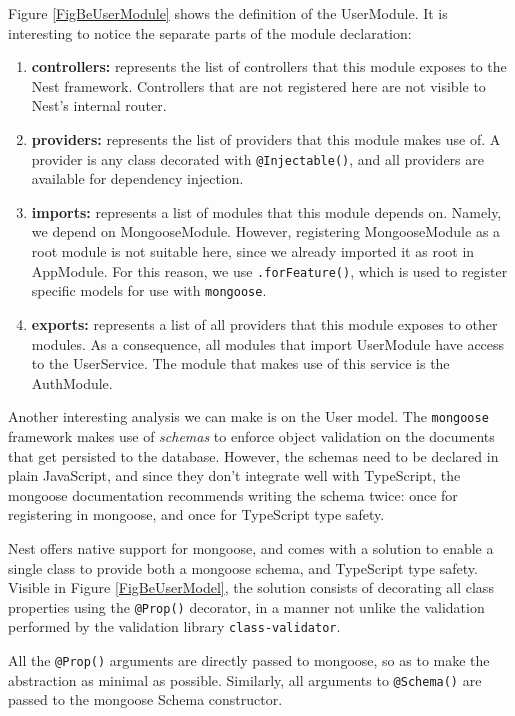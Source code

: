 Figure \ref{FigBeUserModule} shows the definition of the UserModule. It is interesting to notice the separate parts of the module declaration:
\begin{enumerate}
    \item \textbf{controllers:} represents the list of controllers that this module exposes to the Nest framework. Controllers that are not registered here are not visible to Nest's internal router.
    \item \textbf{providers:} represents the list of providers that this module makes use of. A provider is any class decorated with \verb|@Injectable()|, and all providers are available for dependency injection.
    \item \textbf{imports:} represents a list of modules that this module depends on. Namely, we depend on MongooseModule. However, registering MongooseModule as a root module is not suitable here, since we already imported it as root in AppModule. For this reason, we use \verb|.forFeature()|, which is used to register specific models for use with \verb|mongoose|.
    \item \textbf{exports:} represents a list of all providers that this module exposes to other modules. As a consequence, all modules that import UserModule have access to the UserService. The module that makes use of this service is the AuthModule.
\end{enumerate}

Another interesting analysis we can make is on the User model. The \verb|mongoose| framework makes use of \textit{schemas} to enforce object validation on the documents that get persisted to the database. However, the schemas need to be declared in plain JavaScript, and since they don't integrate well with TypeScript, the mongoose documentation recommends writing the schema twice: once for registering in mongoose, and once for TypeScript type safety.

Nest offers native support for mongoose, and comes with a solution to enable a single class to provide both a mongoose schema, and TypeScript type safety. Visible in Figure \ref{FigBeUserModel}, the solution consists of decorating all class properties using the \verb|@Prop()| decorator, in a manner not unlike the validation performed by the validation library \verb|class-validator|.

All the \verb|@Prop()| arguments are directly passed to mongoose, so as to make the abstraction as minimal as possible. Similarly, all arguments to \verb|@Schema()| are passed to the mongoose Schema constructor.

